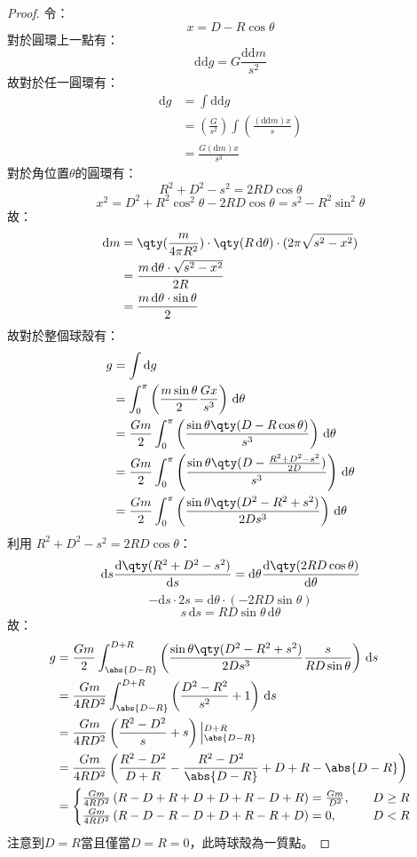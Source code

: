 \documentclass[a4paper,12pt]{article}
\begin{document}
\begin{proof}
令：
\[x=D-R\cos\theta\]
對於圓環上一點有：
\[\mathrm{d}\mathrm{d}g=G\frac{\mathrm{d}\mathrm{d}m}{s^2}\]
故對於任一圓環有：
\[\begin{aligned}
\mathrm{d}g&=\int\mathrm{d}\mathrm{d}g\\
&=\left(\frac{G}{s^2}\right)\int\left(\frac{(\mathrm{d}\mathrm{d}m)x}{s}\right)\\
&=\frac{G(\mathrm{d}m)x}{s^3} 
\end{aligned}\]
對於角位置$\theta$的圓環有：
\[R^2+D^2-s^2=2RD\cos\theta\]
\[ x^2 = D^2 + R^2 \cos^2 \theta - 2RD \cos \theta = s^2 - R^2 \sin^2 \theta \]
故：
\[\begin{aligned}
\mathrm{d}m &= \qty(\frac{m}{4\pi R^2})\cdot\qty(R\,\mathrm{d}\theta)\cdot(2\pi\sqrt{s^2 - x^2}) \\
&= \frac{m\,\mathrm{d}\theta\cdot\sqrt{s^2-x^2}}{2R}\\
&= \frac{m\,\mathrm{d}\theta\cdot\sin\theta}{2}
\end{aligned}\]
故對於整個球殼有：
\[\begin{aligned}
g &= \int \mathrm{d}g \\
&= \int_0^\pi\left(\frac{m\sin\theta}{2}\frac{Gx}{s^3}\right)\,\mathrm{d}\theta\\
&= \frac{Gm}{2}\int_0^\pi\left(\frac{\sin\theta\qty(D-R\cos\theta)}{s^3}\right)\,\mathrm{d}\theta\\
&= \frac{Gm}{2}\int_0^\pi\left(\frac{\sin\theta\qty(D-\frac{R^2 + D^2 - s^2}{2D})}{s^3}\right)\,\mathrm{d}\theta\\
&= \frac{Gm}{2}\int_0^\pi\left(\frac{\sin\theta\qty(D^2-R^2+s^2)}{2Ds^3}\right)\,\mathrm{d}\theta
\end{aligned}\]
利用 \( R^2 + D^2 - s^2 = 2 R D \cos \theta \)：
\[ \mathrm{d}s \frac{\mathrm{d}\qty(R^2 + D^2 - s^2)}{\mathrm{d}s} = \mathrm{d}\theta \frac{\mathrm{d}\qty(2 R D \cos \theta)}{\mathrm{d}\theta} \]
\[ -\mathrm{d}s \cdot 2s = \mathrm{d}\theta \cdot (-2 R D \sin \theta) \]
\[ s \, \mathrm{d}s = R D \sin \theta \, \mathrm{d}\theta \]
故：
\[\begin{aligned}
g &= \frac{Gm}{2}\int_{\abs{D-R}}^{D+R}\left(\frac{\sin\theta\qty(D^2-R^2+s^2)}{2Ds^3}\frac{s}{RD\sin\theta}\right)\,\mathrm{d}s\\
&= \frac{Gm}{4RD^2}\int_{\abs{D-R}}^{D+R}\left(\frac{D^2-R^2}{s^2}+1\right)\,\mathrm{d}s\\
&= \frac{Gm}{4RD^2}\left(\frac{R^2-D^2}{s}+s\right)\left|_{\abs{D-R}}^{D+R}\right.\\
&= \frac{Gm}{4RD^2}\left(\frac{R^2-D^2}{D+R}-\frac{R^2-D^2}{\abs{D-R}}+D+R-\abs{D-R}\right)\\
&=\begin{cases}
\frac{Gm}{4RD^2}\left(R-D+R+D+D+R-D+R\right)=\frac{Gm}{D^2},\quad & D\geq R\\
\frac{Gm}{4RD^2}\left(R-D-R-D+D+R-R+D\right)=0,\quad & D<R
\end{cases}
\end{aligned}\]
注意到$D=R$當且僅當$D=R=0$，此時球殼為一質點。
\end{proof}
\end{document}

